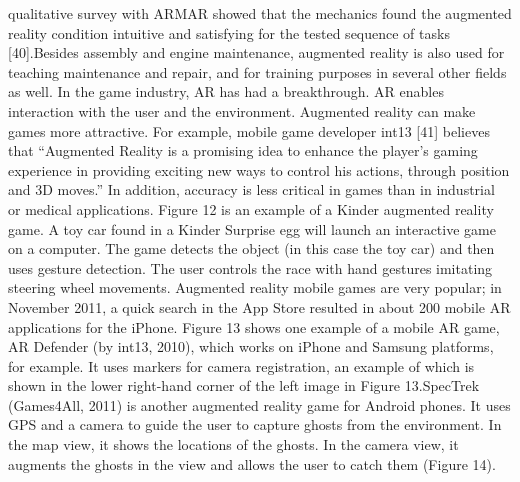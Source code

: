 qualitative survey with ARMAR showed that the mechanics found the augmented reality condition intuitive and satisfying for the tested sequence of tasks [40].Besides assembly and engine maintenance, augmented reality is also used for teaching maintenance and repair, and for training purposes in several other fields as well. In the game industry, AR has had a breakthrough. AR enables interaction with the user and the environment. Augmented reality can make games more attractive. For example, mobile game developer int13 [41] believes that “Augmented Reality is a promising idea to enhance the player's gaming experience in providing exciting new ways to control his actions, through position and 3D moves.” In addition, accuracy is less critical in games than in industrial or medical applications. Figure 12 is an example of a Kinder augmented reality game. A toy car found in a Kinder Surprise egg will launch an interactive game on a computer. The game detects the object (in this case the toy car) and then uses gesture detection. The user controls the race with hand gestures imitating steering wheel movements. Augmented reality mobile games are very popular; in November 2011, a quick search in the App Store resulted in about 200 mobile AR applications for the iPhone. Figure 13 shows one example of a mobile AR game, AR Defender (by int13, 2010), which works on iPhone and Samsung platforms, for example. It uses markers for camera registration, an example of which is shown in the lower right-hand corner of the left image in Figure 13.SpecTrek (Games4All, 2011) is another augmented reality game for Android phones. It uses GPS and a camera to guide the user to capture ghosts from the environment. In the map view, it shows the locations of the ghosts. In the camera view, it augments the ghosts in the view and allows the user to catch them (Figure 14).


